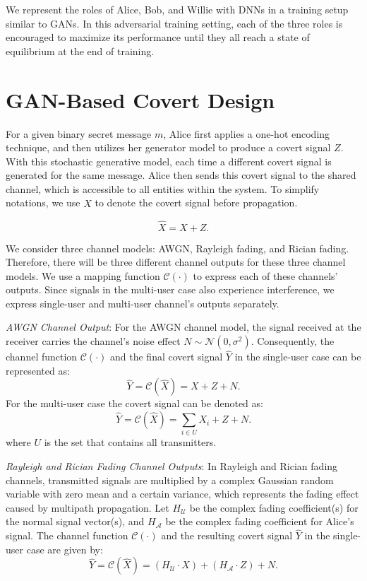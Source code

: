 We represent the roles of Alice, Bob, and Willie with DNNs in a training setup similar to GANs. In this adversarial training setting, each of the three roles is encouraged to maximize its performance until they all reach a state of equilibrium at the end of training.

\section{GAN-Based Covert Design}
\label{s:gan_covert}
For a given binary secret message \(m\), Alice first applies a one-hot encoding technique, and then utilizes her generator model to produce a covert signal \(Z\). With this stochastic generative model, each time a different covert signal is generated for the same message. Alice then sends this covert signal to the shared channel, which is accessible to all entities within the system. To simplify notations, we use \(\hat{X}\) to denote the covert signal before propagation.

\begin{equation}
	\hat{X} = X + Z.
\end{equation}

We consider three channel models: AWGN, Rayleigh fading, and Rician fading. Therefore, there will be three different channel outputs for these three channel models. We use a mapping function \(\mathcal{C}(\cdot)\) to express each of these channels' outputs. Since signals in the multi-user case also experience interference, we express single-user and multi-user channel's outputs separately.

\textit{AWGN Channel Output}: For the AWGN channel model, the signal received at the receiver carries the channel's noise effect \(N \sim \mathcal{N}(0, \sigma^2)\). Consequently, the channel function \(\mathcal{C}(\cdot)\) and the final covert signal \(\hat{Y}\) in the single-user case can be represented as:
\begin{equation}
	\hat{Y} = \mathcal{C}(\hat{X}) = X + Z + N.
\end{equation}
For the multi-user case the covert signal can be denoted as:
\begin{equation}
	\hat{Y} = \mathcal{C}(\hat{X}) = \sum_{i \in U}X_i + Z + N.
\end{equation}
where \(U\) is the set that contains all transmitters.

\textit{Rayleigh and Rician Fading Channel Outputs}: In Rayleigh and Rician fading channels, transmitted signals are multiplied by a complex Gaussian random variable with zero mean and a certain variance, which represents the fading effect caused by multipath propagation. Let \(H_{\mathcal{U}}\) be the complex fading coefficient(s) for the normal signal vector(s), and \(H_{\mathcal{A}}\) be the complex fading coefficient for Alice's signal. The channel function \(\mathcal{C}(\cdot)\) and the resulting covert signal \(\hat{Y}\) in the single-user case are given by:
\begin{equation}
	\hat{Y} = \mathcal{C}(\hat{X}) = (H_{\mathcal{U}} \cdot X) + (H_{\mathcal{A}} \cdot Z) + N.
\end{equation}

